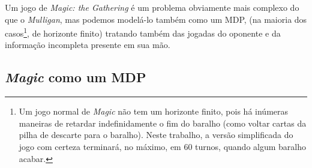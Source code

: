 \documentclass{book}
\begin{document}
Um jogo de \textit{Magic: the Gathering} é um problema obviamente mais complexo do que o \textit{Mulligan}, mas podemos modelá-lo também como um MDP,
(na maioria dos casos\footnote{Um jogo normal de \textit{Magic} não tem um horizonte finito, pois há
inúmeras maneiras de retardar indefinidamente o fim do baralho (como voltar cartas da pilha de descarte para o baralho). Neste trabalho, a versão
simplificada do jogo com certeza terminará, no máximo, em 60 turnos, quando algum baralho acabar.}, de horizonte finito) tratando também das jogadas do oponente e da informação incompleta presente em sua mão.

\subsection{\textit{Magic} como um MDP}
\end{document}

